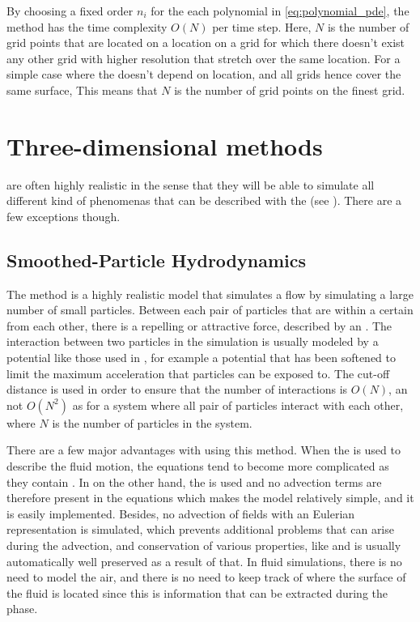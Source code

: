 By choosing a fixed order $n_i$ for the each polynomial in \eqref{eq:polynomial_pde}, the method has the time complexity $O(N)$ per time step. Here, $N$ is the number of grid points that are located on a location on a grid for which there doesn't exist any other grid with higher resolution that stretch over the same location. For a simple case where the  doesn't depend on location, and all grids hence cover the same surface, This means that $N$ is the number of grid points on the finest grid.

\section{Three-dimensional methods}

 are often highly realistic in the sense that they will be able to simulate all different kind of phenomenas that can be described with the  (see ). There are a few exceptions though.

\subsection{Smoothed-Particle Hydrodynamics}

The \SPH method is a highly realistic model that simulates a flow by simulating a large number of small particles. Between each pair of particles that are within a certain  from each other, there is a repelling or attractive force, described by an \ODE. The interaction between two particles in the simulation is usually modeled by a potential like those used in \MD, for example a \LJ potential that has been softened to limit the maximum acceleration that particles can be exposed to. The cut-off distance is used in order to ensure that the number of interactions is $O(N)$, an not $O(N^2)$ as for a system where all pair of particles interact with each other, where $N$ is the number of particles in the system.

There are a few major advantages with using this method. When the  is used to describe the fluid motion, the equations tend to become more complicated as they contain . In \SPH on the other hand, the  is used and no advection terms are therefore present in the equations which makes the model relatively simple, and it is easily implemented. Besides, no advection of fields with an Eulerian representation is simulated, which prevents additional problems that can arise during the advection, and conservation of various properties, like \momentum and \energy is usually automatically well preserved as a result of that. In fluid simulations, there is no need to model the air, and there is no need to keep track of where the surface of the fluid is located since this is information that can be extracted during the  phase.

